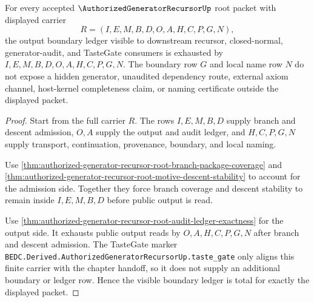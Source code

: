 \begin{theorem}
\label{thm:authorized-generator-recursor-root-boundary-ledger-totality}
For every accepted $\AuthorizedGeneratorRecursorUp$ root packet with displayed carrier
$$
R=(I,E,M,B,D,O,A,H,C,P,G,N),
$$
the output boundary ledger visible to downstream recursor, closed-normal, generator-audit, and TasteGate consumers is exhausted by $I,E,M,B,D,O,A,H,C,P,G,N$. The boundary row $G$ and local name row $N$ do not expose a hidden generator, unaudited dependency route, external axiom channel, host-kernel completeness claim, or naming certificate outside the displayed packet.
\end{theorem}
\begin{proof}
Start from the full carrier $R$. The rows $I,E,M,B,D$ supply branch and descent admission, $O,A$ supply the output and audit ledger, and $H,C,P,G,N$ supply transport, continuation, provenance, boundary, and local naming.

Use \autoref{thm:authorized-generator-recursor-root-branch-package-coverage} and \autoref{thm:authorized-generator-recursor-root-motive-descent-stability} to account for the admission side. Together they force branch coverage and descent stability to remain inside $I,E,M,B,D$ before public output is read.

Use \autoref{thm:authorized-generator-recursor-root-audit-ledger-exactness} for the output side. It exhausts public output reads by $O,A,H,C,P,G,N$ after branch and descent admission. The TasteGate marker \texttt{BEDC.Derived.AuthorizedGeneratorRecursorUp.taste\_gate} only aligns this finite carrier with the chapter handoff, so it does not supply an additional boundary or ledger row. Hence the visible boundary ledger is total for exactly the displayed packet.
\end{proof}

